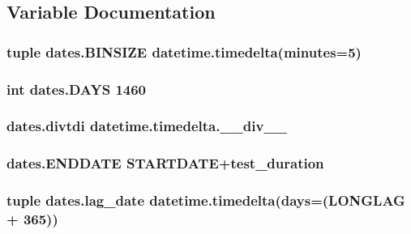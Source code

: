 \subsection{Variable Documentation}
\hypertarget{namespacedates_a67b3a3a8f382e17df58f50fef4a7fb6d}{
\subsubsection[{B\-I\-N\-S\-I\-Z\-E}]{\setlength{\rightskip}{0pt plus 5cm}tuple dates.\-B\-I\-N\-S\-I\-Z\-E datetime.\-timedelta(minutes=5)}}\label{namespacedates_a67b3a3a8f382e17df58f50fef4a7fb6d}
\hypertarget{namespacedates_a0bb42c665f258bad88c203d83beffc2d}{
\subsubsection[{D\-A\-Y\-S}]{\setlength{\rightskip}{0pt plus 5cm}int dates.\-D\-A\-Y\-S 1460}}\label{namespacedates_a0bb42c665f258bad88c203d83beffc2d}
\hypertarget{namespacedates_a0a75bf3ce0cc8409fe6cca4a3bb439e6}{
\subsubsection[{divtdi}]{\setlength{\rightskip}{0pt plus 5cm}dates.\-divtdi datetime.\-timedelta.\-\_\-\-\_\-div\-\_\-\-\_\-}}\label{namespacedates_a0a75bf3ce0cc8409fe6cca4a3bb439e6}
\hypertarget{namespacedates_aee682e27a5cb1e7fae89ee59079f8c46}{
\subsubsection[{E\-N\-D\-D\-A\-T\-E}]{\setlength{\rightskip}{0pt plus 5cm}dates.\-E\-N\-D\-D\-A\-T\-E {\bf S\-T\-A\-R\-T\-D\-A\-T\-E}+{\bf test\-\_\-duration}}}\label{namespacedates_aee682e27a5cb1e7fae89ee59079f8c46}
\hypertarget{namespacedates_aa7d9556c2429b0dd8c5c3903ec21a708}{
\subsubsection[{lag\-\_\-date}]{\setlength{\rightskip}{0pt plus 5cm}tuple dates.\-lag\-\_\-date datetime.\-timedelta(days=(L\-O\-N\-G\-L\-A\-G + 365))}}\label{namespacedates_aa7d9556c2429b0dd8c5c3903ec21a708}
